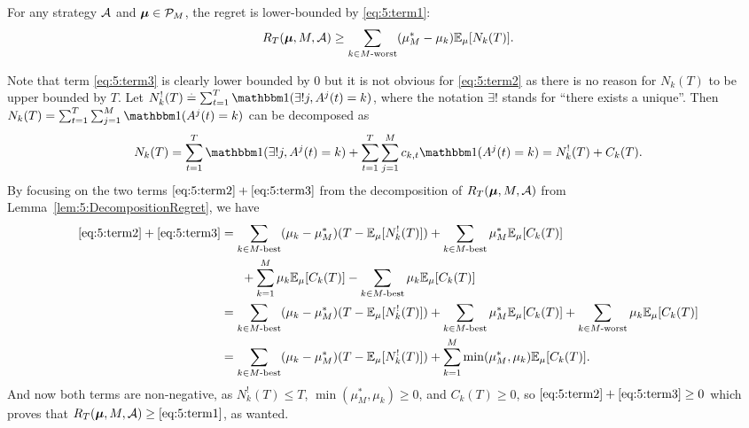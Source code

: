 \begin{lemma}\label{lem:5:1stLowerBound}
\begin{leftbar}[lemmabar]  %
    For any strategy $\mathcal{A}$ and $\boldsymbol{\mu}\in\mathcal{P}_M$, the regret is lower-bounded by \ref{eq:5:term1}:
    \begin{align*}
        R_T(\boldsymbol{\mu}, M, \mathcal{A})    \geq \sum\limits_{k \in M\text{-}\mathrm{worst}} (\mu_M^*- \mu_k) \mathbb{E}_{\mu}[N_k(T)].
    \end{align*}
\end{leftbar}  %
\end{lemma}

\begin{smallproof}
  Note that term \ref{eq:5:term3} is clearly lower bounded by $0$
  but it is not obvious for \ref{eq:5:term2} as there is no reason for $N_k(T)$ to be upper bounded by $T$.
  Let $N_k^{!}(T) \eqdef \sum_{t=1}^{T} \indic(\exists! j, A^j(t)=k)$,
  where the notation $\exists!$ stands for ``there exists a unique''.
  Then $N_k(T) = \sum_{t=1}^{T} \sum_{j=1}^{M} \indic(A^j(t) = k)$ can be decomposed as
  \begin{equation*}
    N_k(T) = \sum_{t=1}^{T} \indic(\exists! j, A^j(t) = k) + \sum_{t=1}^{T} \sum_{j=1}^{M} c_{k,t} \indic(A^j(t) = k)
    = N_k^{!}(T) + C_k(T).
  \end{equation*}
  By focusing on the two terms $\ref{eq:5:term2} + \ref{eq:5:term3}$ from the decomposition of $R_T(\boldsymbol{\mu}, M, \mathcal{A})$ from Lemma~\ref{lem:5:DecompositionRegret}, we have
  \begin{align*}
    \ref{eq:5:term2} + \ref{eq:5:term3} &=
    \sum_{k \in M\text{-}\mathrm{best}} (\mu_k - \mu_M^*) (T - \mathbb{E}_{\mu}[N_k^!(T)])
    + \sum_{k \in M\text{-}\mathrm{best}} \mu_M^* \mathbb{E}_{\mu}[C_k(T)] \\
    & \;\;\;\;\;\; + \sum_{k=1}^{M} \mu_k \mathbb{E}_{\mu}[C_k(T)]
    - \sum_{k \in M\text{-}\mathrm{best}} \mu_k \mathbb{E}_{\mu}[C_k(T)] \\
    &=
    \sum_{k \in M\text{-}\mathrm{best}} (\mu_k - \mu_M^*) (T - \mathbb{E}_{\mu}[N_k^!(T)])
    + \sum_{k \in M\text{-}\mathrm{best}} \mu_M^* \mathbb{E}_{\mu}[C_k(T)]
    + \sum_{k \in M\text{-}\mathrm{worst}} \mu_k \mathbb{E}_{\mu}[C_k(T)] \\
    &=
    \sum_{k \in M\text{-}\mathrm{best}} (\mu_k - \mu_M^*) (T - \mathbb{E}_{\mu}[N_k^!(T)])
    + \sum_{k=1}^{M} \min(\mu_M^*, \mu_k) \mathbb{E}_{\mu}[C_k(T)].
  \end{align*}
  And now both terms are non-negative, as $N_k^!(T) \leq T$, $\min(\mu_M^*, \mu_k)\geq 0$, and $C_k(T) \geq 0$, so $\ref{eq:5:term2} + \ref{eq:5:term3} \geq 0$
  which proves that $R_T(\boldsymbol{\mu}, M, \mathcal{A}) \geq \ref{eq:5:term1}$, as wanted.
\end{smallproof}


